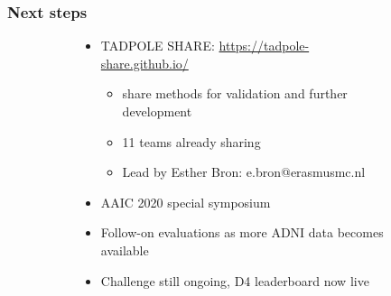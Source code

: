 \documentclass[8pt,xcolor=table,aspectratio=169]{beamer}
\begin{document}
\begin{frame}
\frametitle{Next steps}

\begin{figure}
 
\begin{subfigure}{0.6\textwidth}
 
\begin{itemize}


\item TADPOLE SHARE: \url{https://tadpole-share.github.io/}
    \begin{itemize}
    \item share methods for validation and further development
    \item 11 teams already sharing
    \item Lead by Esther Bron: e.bron@erasmusmc.nl
    \end{itemize}

\vspace{3em}

\item AAIC 2020 special symposium

\vspace{3em}

\item Follow-on evaluations as more ADNI data becomes available

\vspace{3em}

\item Challenge still ongoing, D4 leaderboard now live

\end{itemize}


\end{subfigure}
\end{figure}
\end{frame}
\end{document}
